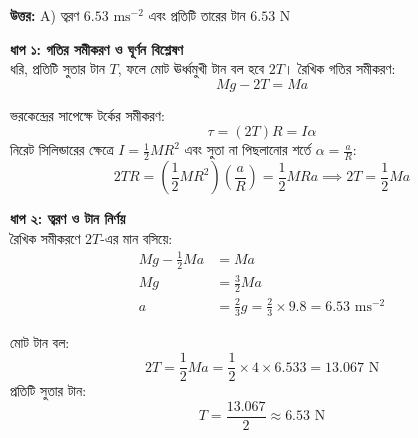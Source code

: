\documentclass[12pt, a4paper]{article}
\begin{document}
\vspace{0.5em}
\begin{tcolorbox}[answerbox]
    \textbf{\color{success} উত্তর:} A) ত্বরণ $6.53\text{ ms}^{-2}$ এবং প্রতিটি তারের টান $6.53\text{ N}$
\end{tcolorbox}
\vspace{1em}

\begin{tcolorbox}[solutionbox={সমাধান (Solution)}]
    \noindent
    \textbf{ধাপ ১: গতির সমীকরণ ও ঘূর্ণন বিশ্লেষণ} \\
    ধরি, প্রতিটি সুতার টান $T$, ফলে মোট ঊর্ধ্বমুখী টান বল হবে $2T$। 
    রৈখিক গতির সমীকরণ:
    \[ M g - 2T = M a \]
    
    ভরকেন্দ্রের সাপেক্ষে টর্কের সমীকরণ:
    \[ \tau = (2T) R = I \alpha \]
    নিরেট সিলিন্ডারের ক্ষেত্রে $I = \frac{1}{2} M R^2$ এবং সুতা না পিছলানোর শর্তে $\alpha = \frac{a}{R}$:
    \[ 2T R = \left(\frac{1}{2} M R^2\right) \left(\frac{a}{R}\right) = \frac{1}{2} M R a \implies 2T = \frac{1}{2} M a \]
    
    \vspace{0.5em}
    \noindent\textbf{ধাপ ২: ত্বরণ ও টান নির্ণয়} \\
    রৈখিক সমীকরণে $2T$-এর মান বসিয়ে:
    \begin{align*}
        M g - \frac{1}{2} M a &= M a \\
        M g &= \frac{3}{2} M a \\
        a &= \frac{2}{3} g = \frac{2}{3} \times 9.8 = \mathbf{6.53}\text{ ms}^{-2}
    \end{align*}
    
    মোট টান বল:
    \[ 2T = \frac{1}{2} M a = \frac{1}{2} \times 4 \times 6.533 = 13.067\text{ N} \]
    প্রতিটি সুতার টান:
    \[ T = \frac{13.067}{2} \approx \mathbf{6.53}\text{ N} \]
\end{tcolorbox}

\newpage
\end{document}
